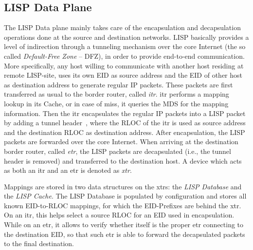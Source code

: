 \subsection{LISP Data Plane}
\label{sec:data_plane}
The LISP Data plane mainly takes care of the encapsulation and decapsulation operations done at the source and destination networks. LISP basically provides a level of indirection through a tunneling mechanism over the core Internet (the so called \emph{Default-Free Zone} -- DFZ), in order to provide end-to-end communication. More specifically, any host willing to communicate with another host residing at remote LISP-site, uses its own EID as source address and the EID of other host as destination address to generate regular IP packets. These packets are first transferred as usual to the border router, called \emph{\acrfull{itr}}. \acrshort{itr} performs a mapping lookup in its Cache, or in case of miss, it queries the MDS for the mapping information. Then the \acrshort{itr} encapsulates the regular IP packets into a LISP packet by adding a tunnel header~\cite{rfc6830}, where the RLOC of the \acrshort{itr} is used as source address and the destination RLOC as destination address. After encapsulation, the LISP packets are forwarded over the core Internet. When arriving at the destination border router, called \emph{\acrfull{etr}}, the LISP packets are decapsulated (i.e., the tunnel header is removed) and transferred to the destination host. A device which acts as both an \acrshort{itr} and an \acrshort{etr} is denoted as \emph{\acrshort{xtr}}.

Mappings are stored in two data structures on the \acrshort{xtr}s: the \emph{LISP Database} and the \emph{LISP Cache}. The LISP Database is populated by configuration and stores all known EID-to-RLOC mappings, for which the EID-Prefixes are behind the \acrshort{xtr}. On an \acrshort{itr}, this helps select a source RLOC for an EID used in encapsulation. While on an \acrshort{etr}, it allows to verify whether itself is the proper \acrshort{etr} connecting to the destination EID, so that such \acrshort{etr} is able to forward the decapsulated packets to the final destination. 

